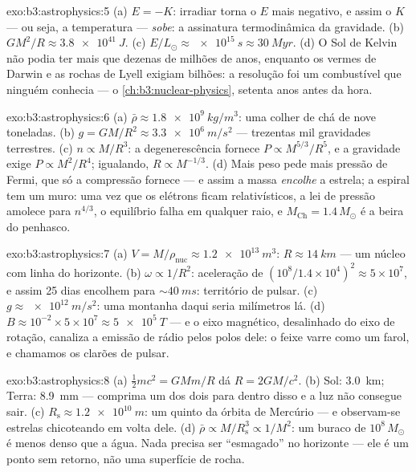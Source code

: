 \begin{solution}{exo:b3:astrophysics:5}
(a) $E = -K$: irradiar torna o $E$ mais negativo, e assim o $K$ ---
ou seja, a temperatura --- \emph{sobe}: a assinatura termodinâmica da
gravidade. (b) $GM^2/R \approx \qty{3.8e41}{J}$. (c)
$E/L_\odot \approx \qty{e15}{s} \approx \qty{30}{Myr}$. (d)
O Sol de Kelvin não podia ter mais que dezenas de milhões de anos,
enquanto os vermes de Darwin e as rochas de Lyell exigiam bilhões: a
resolução foi um combustível que ninguém conhecia --- o
\cref{ch:b3:nuclear-physics}, setenta anos antes da hora.
\end{solution}

\begin{solution}{exo:b3:astrophysics:6}
(a) $\bar\rho \approx \qty{1.8e9}{kg/m^3}$: uma colher de chá de
nove toneladas. (b) $g = GM/R^2 \approx \qty{3.3e6}{m/s^2}$ --- trezentas
mil gravidades terrestres. (c) $n \propto M/R^3$:
a degenerescência fornece $P \propto M^{5/3}/R^5$, e a gravidade exige
$P \propto M^2/R^4$; igualando, $R \propto M^{-1/3}$. (d) Mais
peso pede mais pressão de Fermi, que só a compressão
fornece --- e assim a massa \emph{encolhe} a estrela; a espiral tem um
muro: uma vez que os elétrons ficam relativísticos, a lei de pressão
amolece para $n^{4/3}$, o equilíbrio falha em qualquer raio, e
$M_{\text{Ch}} = 1.4\,M_\odot$ é a beira do penhasco.
\end{solution}

\begin{solution}{exo:b3:astrophysics:7}
(a) $V = M/\rho_{\text{nuc}} \approx \qty{1.2e13}{m^3}$:
$R \approx \qty{14}{km}$ --- um núcleo com linha do horizonte. (b)
$\omega \propto 1/R^2$: aceleração de $(10^8/1.4\times10^4)^2
\approx 5\times10^{7}$, e assim 25 dias encolhem para
${\sim}\qty{40}{ms}$: território de pulsar. (c) $g \approx
\qty{e12}{m/s^2}$: uma montanha daqui seria milímetros lá.
(d) $B \approx 10^{-2}\times5\times10^{7} \approx
\qty{5e5}{T}$ --- e o eixo magnético, desalinhado do
eixo de rotação, canaliza a emissão de rádio pelos polos dele: o feixe
varre como um farol, e chamamos os clarões de pulsar.
\end{solution}

\begin{solution}{exo:b3:astrophysics:8}
(a) $\tfrac12mc^2 = GMm/R$ dá $R = 2GM/c^2$. (b) Sol:
\qty{3.0}{km}; Terra: \qty{8.9}{mm} --- comprima um dos dois para dentro
disso e a luz não consegue sair. (c) $R_{\text{s}} \approx
\qty{1.2e10}{m}$: um quinto da órbita de Mercúrio --- e observam-se
estrelas chicoteando em volta dele. (d) $\bar\rho \propto
M/R_{\text{s}}^3 \propto 1/M^2$: um buraco de $10^8\,M_\odot$ é menos
denso que a água. Nada precisa ser ``esmagado'' no horizonte ---
ele é um ponto sem retorno, não uma superfície de rocha.
\end{solution}

